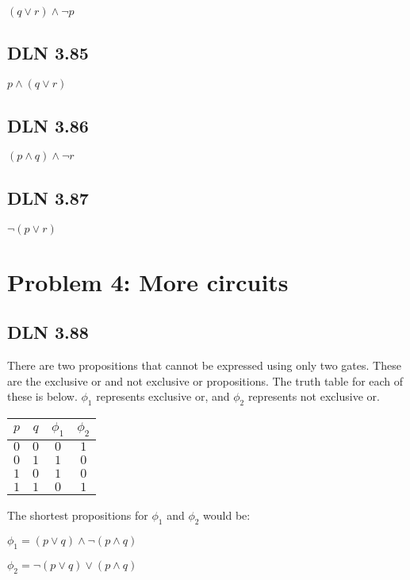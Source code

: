 \documentclass[titlepage]{article}
\begin{document}
\( (q \lor r) \land \lnot p \)

\subsection{DLN 3.85} 

\( p \land (q \lor r) \)

\subsection{DLN 3.86} 

\( (p \land q) \land \lnot r \)

\subsection{DLN 3.87} 

\( \lnot (p \lor r) \)

\section{Problem 4: More circuits}

\subsection{DLN 3.88} 

There are two propositions that cannot be expressed using only two gates. These are the exclusive or and not exclusive or propositions. The truth table for each of these is below. $\phi _1$ represents exclusive or, and $\phi _2$ represents not exclusive or.

\begin{center}
\begin{tabular}{c c|c|c}
\textbf{$p$} & \textbf{$q$} & \textbf{$\phi _1$} & \textbf{$\phi _2$} \\ \hline
\(0\) & \(0\) & \(0\) & \(1\) \\
\(0\) & \(1\) & \(1\) & \(0\) \\
\(1\) & \(0\) & \(1\) & \(0\) \\
\(1\) & \(1\) & \(0\) & \(1\) \\
\end{tabular}
\end{center}

The shortest propositions for $\phi _1$ and $\phi _2$ would be:

\( \phi _1 = (p \lor q) \land \lnot(p \land q)\)

\( \phi _2 = \lnot (p \lor q) \lor (p \land q)\)
\end{document}
